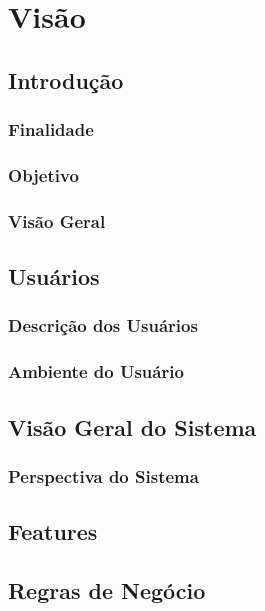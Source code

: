 \chapter[Visão]{Visão}

\section{Introdução}

\subsection{Finalidade}

\subsection{Objetivo}

\subsection{Visão Geral}


\section{Usuários}

\subsection{Descrição dos Usuários}

\subsection{Ambiente do Usuário}


\section{Visão Geral do Sistema}

\subsection{Perspectiva do Sistema}


\section{Features}


\section{Regras de Negócio}

